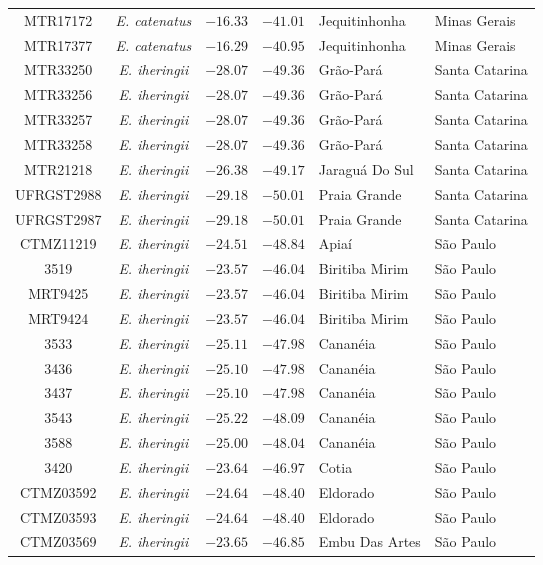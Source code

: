 \begin{longtable}{cc>{\centering\arraybackslash}p{100px}>{\centering\arraybackslash}p{100px}>{\centering\arraybackslash}p{100px}>{\centering\arraybackslash}p{100px}}
MTR17172 & \emph{E. catenatus} & $-16.33$ & $-41.01$ & Jequitinhonha & Minas Gerais \\ 
MTR17377 & \emph{E. catenatus} & $-16.29$ & $-40.95$ & Jequitinhonha & Minas Gerais \\ 
MTR33250 & \emph{E. iheringii} & $-28.07$ & $-49.36$ & Grão-Pará & Santa Catarina \\ 
MTR33256 & \emph{E. iheringii} & $-28.07$ & $-49.36$ & Grão-Pará & Santa Catarina \\ 
MTR33257 & \emph{E. iheringii} & $-28.07$ & $-49.36$ & Grão-Pará & Santa Catarina \\ 
MTR33258 & \emph{E. iheringii} & $-28.07$ & $-49.36$ & Grão-Pará & Santa Catarina \\ 
MTR21218 & \emph{E. iheringii} & $-26.38$ & $-49.17$ & Jaraguá Do Sul & Santa Catarina \\ 
UFRGST2988 & \emph{E. iheringii} & $-29.18$ & $-50.01$ & Praia Grande & Santa Catarina \\ 
UFRGST2987 & \emph{E. iheringii} & $-29.18$ & $-50.01$ & Praia Grande & Santa Catarina \\ 
CTMZ11219 & \emph{E. iheringii} & $-24.51$ & $-48.84$ & Apiaí & São Paulo \\ 
3519 & \emph{E. iheringii} & $-23.57$ & $-46.04$ & Biritiba Mirim & São Paulo \\ 
MRT9425 & \emph{E. iheringii} & $-23.57$ & $-46.04$ & Biritiba Mirim & São Paulo \\ 
MRT9424 & \emph{E. iheringii} & $-23.57$ & $-46.04$ & Biritiba Mirim & São Paulo \\ 
3533 & \emph{E. iheringii} & $-25.11$ & $-47.98$ & Cananéia & São Paulo \\ 
3436 & \emph{E. iheringii} & $-25.10$ & $-47.98$ & Cananéia & São Paulo \\ 
3437 & \emph{E. iheringii} & $-25.10$ & $-47.98$ & Cananéia & São Paulo \\ 
3543 & \emph{E. iheringii} & $-25.22$ & $-48.09$ & Cananéia & São Paulo \\ 
3588 & \emph{E. iheringii} & $-25.00$ & $-48.04$ & Cananéia & São Paulo \\ 
3420 & \emph{E. iheringii} & $-23.64$ & $-46.97$ & Cotia & São Paulo \\ 
CTMZ03592 & \emph{E. iheringii} & $-24.64$ & $-48.40$ & Eldorado & São Paulo \\ 
CTMZ03593 & \emph{E. iheringii} & $-24.64$ & $-48.40$ & Eldorado & São Paulo \\ 
CTMZ03569 & \emph{E. iheringii} & $-23.65$ & $-46.85$ & Embu Das Artes & São Paulo \\ 

\end{longtable}
